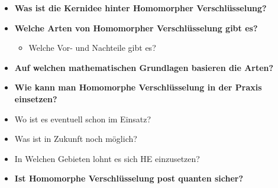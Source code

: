 \label{sec:fragen}
\begin{itemize}
    \item \textbf{Was ist die Kernidee hinter Homomorpher Verschlüsselung?}
    \item \textbf{Welche Arten von Homomorpher Verschlüsselung gibt es?}
    \begin{itemize}
        \item Welche Vor- und Nachteile gibt es?
    \end{itemize}
    \item \textbf{Auf welchen mathematischen Grundlagen basieren die Arten?}
    \item \textbf{Wie kann man Homomorphe Verschlüsselung in der Praxis einsetzen?}
        \item Wo ist es eventuell schon im Einsatz?
        \item Was ist in Zukunft noch möglich?
        \item In Welchen Gebieten lohnt es sich HE einzusetzen?
    \item \textbf{Ist Homomorphe Verschlüsselung post quanten sicher?}
\end{itemize}

\vspace{1em}
